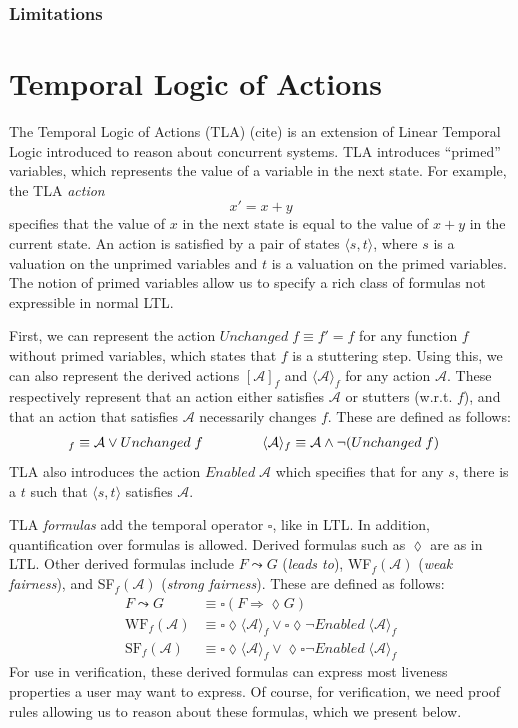 \documentclass{llncs}
\begin{document}
\subsubsection{Limitations}
%
\section{Temporal Logic of Actions}
The Temporal Logic of Actions (TLA) (cite) is an extension of Linear Temporal
Logic introduced to reason about concurrent systems. TLA introduces ``primed''
variables, which represents the value of a variable in the next state. For
example, the TLA \textit{action} $$x' = x + y$$ specifies that the value of $x$
in the next state is equal to the value of $x + y$ in the current state. An
action is satisfied by a pair of states $\langle s, t \rangle$, where $s$ is a
valuation on the unprimed variables and $t$ is a valuation on the primed
variables. The notion of primed variables allow us to specify a rich class of
formulas not expressible in normal LTL.

First, we can represent the action $Unchanged\;f \equiv f' = f$ for any 
function $f$  without primed variables, which states that $f$ is a
stuttering step. Using this, we can also represent the derived actions
$[\mathcal A]_f$ and $\langle \mathcal A \rangle_f$ for any action
$\mathcal A$. These respectively represent that an action either satisfies $\mathcal A$ or
stutters (w.r.t. $f$), and that an action that satisfies $\mathcal A$
necessarily changes $f$. These are defined as follows:
\begin{align*}
  [\mathcal A]_f \equiv \mathcal A \vee Unchanged\;f \hspace{1.5cm}
  & \langle \mathcal A \rangle_f \equiv \mathcal A \wedge \neg(Unchanged\;f)
\end{align*}
TLA also introduces the action $Enabled\;\mathcal A$ which specifies that for
any $s$, there is a $t$ such that $\langle s, t \rangle$ satisfies $\mathcal A$.

TLA \textit{formulas} add the temporal operator $\square$, like in LTL. In
addition, quantification over formulas is allowed. Derived formulas such as
$\lozenge$ are as in LTL. Other derived formulas include $F \leadsto G$
(\textit{leads to}), WF$_f(\mathcal A)$ (\textit{weak fairness}), and
SF$_f(\mathcal A)$ (\textit{strong fairness}). These are defined as follows:
\begin{align*}
  F \leadsto G &\equiv \square(F \Rightarrow \lozenge G) \\
  \text{WF}_f(\mathcal A) &\equiv \square\lozenge\langle\mathcal A\rangle_f \vee \square\lozenge\neg Enabled\;\langle\mathcal A\rangle_f \\
  \text{SF}_f(\mathcal A) &\equiv \square\lozenge\langle\mathcal A\rangle_f \vee \lozenge\square\neg Enabled\;\langle\mathcal A\rangle_f
\end{align*}
For use in verification, these derived formulas can express most liveness
properties a user may want to express. Of course, for verification, we need
proof rules allowing us to reason about these formulas, which we present below.
\end{document}
